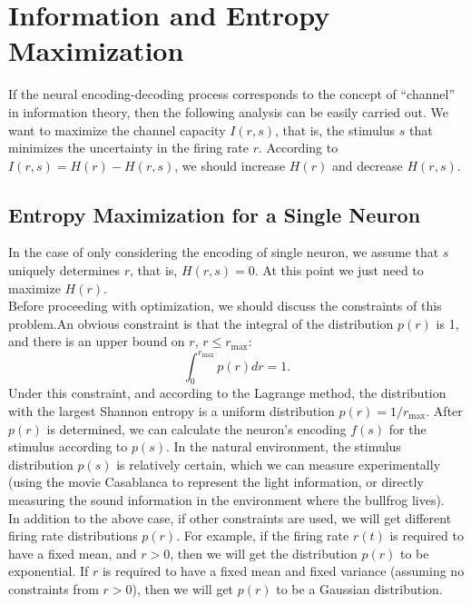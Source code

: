 \section{Information and Entropy Maximization}
\label{sec:Information and Entropy Maximization}
If the neural encoding-decoding process corresponds to the concept of
``channel'' in information theory, then the following analysis can be
easily carried out. We want to maximize the channel capacity $I(r,s)$,
that is, the stimulus $s$ that minimizes the uncertainty in the firing
rate $r$. According to $I(r,s)=H(r)-H(r,s)$, we should increase $H(r)$
and decrease $H(r,s)$.
\subsection{Entropy Maximization for a Single Neuron}
In the case of only considering the encoding of single neuron, we
assume that $s$ uniquely determines $r$, that is, $H(r,s)=0$. At this
point we just need to maximize $H(r)$.\\

Before proceeding with optimization, we should discuss the constraints
of this problem.An obvious constraint is that the integral of the
distribution $p(r)$ is 1, and there is an upper bound on $r$, $r\leq
r_{\max}$:
\begin{equation}
  \int_{0}^{r_{\max}}{p(r)dr}=1.
  \end{equation}
Under this constraint, and
  according to the Lagrange method, the distribution with the largest
  Shannon entropy is a uniform distribution $p(r)=1/r_{\max}$. After
  $p(r)$ is determined, we can calculate the neuron's encoding $f(s)$
  for the stimulus according to $p(s)$. In the natural environment,
  the stimulus distribution $p(s)$ is relatively certain, which we can
  measure experimentally (using the movie Casablanca to represent the
  light information, or directly measuring the sound information in
  the environment where the bullfrog lives).\\

  In addition to the above case, if other constraints are used, we
  will get different firing rate distributions $p(r)$. For example, if
  the firing rate $r(t)$ is required to have a fixed mean, and $r>0$,
  then we will get the distribution $p(r)$ to be exponential. If $r$
  is required to have a fixed mean and fixed variance (assuming no
  constraints from $r>0$), then we will get $p(r)$ to be a Gaussian
  distribution. \\
  

